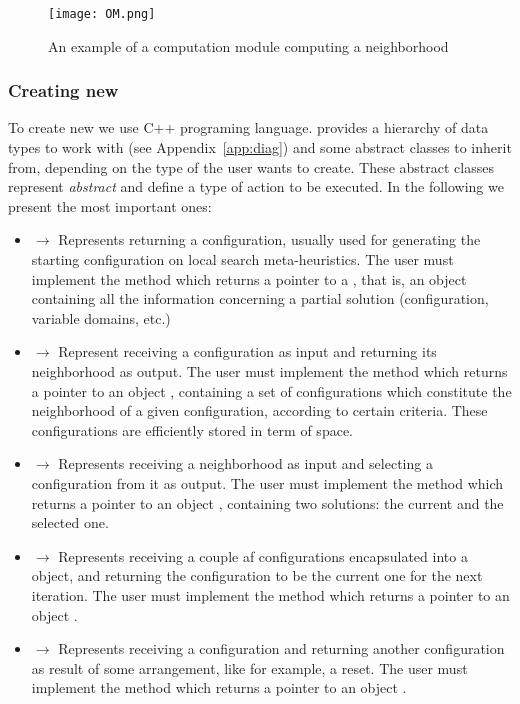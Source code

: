 \begin{figure}
	\centering	
	\texttt{[image: OM.png]}
	\caption{An example of a computation module computing a neighborhood}\label{fig:om}
\end{figure}

\subsubsection{Creating new \oms}
\label{subsubsec:creatingoms}

To create new \oms{} we use C++ programing language. \posl{} provides a hierarchy of data types to work with (see Appendix~\ref{app:diag}) and some abstract classes to inherit from, depending on the type of \om{} the user wants to create. These abstract classes represent {\it abstract} \oms{} and define a type of action to be executed. In the following we present the most important ones:

\begin{itemize}
\item {} $\rightarrow$ Represents \oms{} returning a configuration, usually used for generating the starting configuration on local search meta-heuristics. The user must implement the method  which returns a pointer to a , that is, an object containing all the information concerning a partial solution (configuration, variable domains, etc.)
\item {} $\rightarrow$ Represent \oms{} receiving a configuration as input and returning its neighborhood as output. The user must implement the method  which returns a pointer to an object , containing a set of configurations which constitute the neighborhood of a given configuration, according to certain criteria. These configurations are efficiently stored in term of space.
\item {} $\rightarrow$ Represents \oms{} receiving a neighborhood as input and selecting a configuration from it as output. The user must implement the method  which returns a pointer to an object , containing two solutions: the current and the selected one.
\item {} $\rightarrow$ Represents \oms{} receiving a couple af configurations encapsulated into a  object, and returning the configuration to be the current one for the next iteration. The user must implement the method  which returns a pointer to an object .
\item {} $\rightarrow$ Represents \oms{} receiving a configuration and returning another configuration as result of some arrangement, like for example, a reset. The user must implement the method  which returns a pointer to an object .
\end{itemize}


